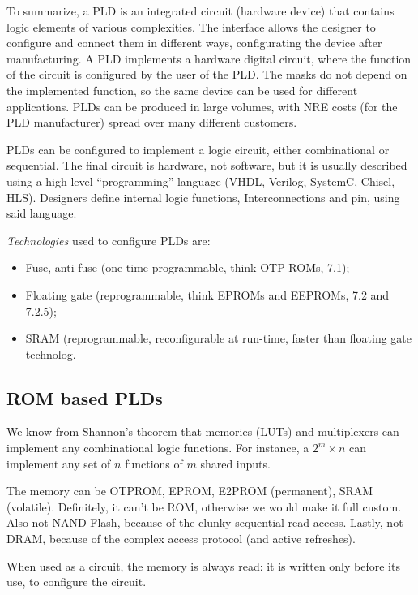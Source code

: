 \documentclass[a4paper,11pt]{article}
\begin{document}
To summarize, a PLD is an integrated circuit (hardware device) that contains logic elements of various complexities.
The interface allows the designer to configure and connect them in different ways, configurating the device after manufacturing.
A PLD implements a hardware digital circuit, where the function of the circuit is configured by the user of the PLD.
The masks do not depend on the implemented function, so the same device can be used for different applications.
PLDs can be produced in large volumes, with NRE costs (for the PLD manufacturer) spread over many different customers.

PLDs can be configured to implement a logic circuit, either combinational or sequential.
The final circuit is hardware, not software, but it is usually described using a high level “programming” language (VHDL, Verilog, SystemC, Chisel, HLS).
Designers define internal logic functions, Interconnections and pin, using said language.

\textit{Technologies} used to configure PLDs are:
\begin{itemize}
	\item Fuse, anti-fuse (one time programmable, think OTP-ROMs, 7.1);
	\item Floating gate (reprogrammable, think EPROMs and EEPROMs, 7.2 and 7.2.5);
	\item SRAM (reprogrammable, reconfigurable at run-time, faster than floating gate technolog.
\end{itemize}

\subsection{ROM based PLDs}

We know from Shannon's theorem that memories (LUTs) and multiplexers can implement any combinational logic functions.
For instance, a $2^m \times n$ can implement any set of $n$ functions of $m$ shared inputs.

The memory can be OTPROM, EPROM, E2PROM (permanent), SRAM (volatile).
Definitely, it can't be ROM, otherwise we would make it full custom.
Also not NAND Flash, because of the clunky sequential read access.
Lastly, not DRAM, because of the complex access protocol (and active refreshes).

When used as a circuit, the memory is always read: it is written only before its use, to configure the circuit.
\end{document}
